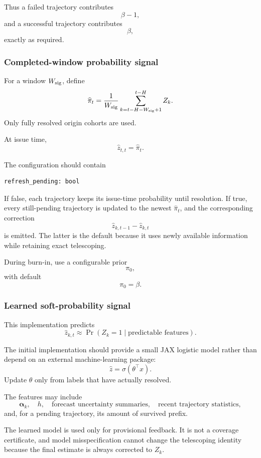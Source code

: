 \documentclass[11pt]{article}
\begin{document}
Thus a failed trajectory contributes
\[
    \beta-1,
\]
and a successful trajectory contributes
\[
    \beta,
\]
exactly as required.

\subsubsection{Completed-window probability signal}

For a window $W_{\rm sig}$, define
\[
    \widehat\pi_t
    =
    \frac1{W_{\rm sig}}
    \sum_{k=t-H-W_{\rm sig}+1}^{t-H}
    Z_k.
\]
Only fully resolved origin cohorts are used.

At issue time,
\[
    \widehat z_{t,t}
    =
    \widehat\pi_t.
\]

The configuration should contain
\begin{verbatim}
refresh_pending: bool
\end{verbatim}

If false, each trajectory keeps its issue-time probability until resolution.
If true, every still-pending trajectory is updated to the newest
$\widehat\pi_t$, and the corresponding correction
\[
    \widehat z_{k,t-1}-\widehat z_{k,t}
\]
is emitted.  The latter is the default because it uses newly available
information while retaining exact telescoping.

During burn-in, use a configurable prior
\[
    \pi_0,
\]
with default
\[
    \pi_0=\beta.
\]

\subsubsection{Learned soft-probability signal}

This implementation predicts
\[
    \widehat z_{k,t}
    \approx
    \Pr(
        Z_k=1
        \mid
        \text{predictable features}
    ).
\]

The initial implementation should provide a small JAX logistic model rather
than depend on an external machine-learning package:
\[
    \widehat z
    =
    \sigma(
        \theta^\top x
    ).
\]
Update $\theta$ only from labels that have actually resolved.

The features may include
\[
    \bm\alpha_k,
    \quad
    h,
    \quad
    \text{forecast uncertainty summaries},
    \quad
    \text{recent trajectory statistics},
\]
and, for a pending trajectory, its amount of survived prefix.

The learned model is used only for provisional feedback.  It is not a
coverage certificate, and model misspecification cannot change the
telescoping identity because the final estimate is always corrected to $Z_k$.
\end{document}
